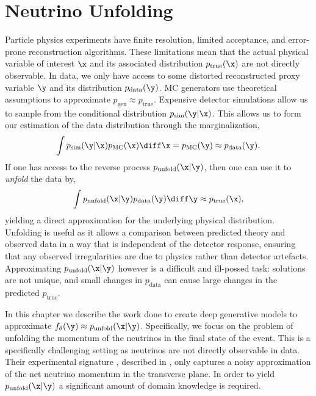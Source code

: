 \chapter{Neutrino Unfolding}
\label{ch:gnns}

Particle physics experiments have finite resolution, limited acceptance, and error-prone reconstruction algorithms.
These limitations mean that the actual physical variable of interest $\x$ and its associated distribution $p_\text{true}(\x)$ are not directly observable.
In data, we only have access to some distorted reconstructed proxy variable $\y$ and its distribution $p_\text{data}(\y)$.
MC generators use theoretical assumptions to approximate $p_\text{gen} \approx p_\text{true}$.
Expensive detector simulations allow us to sample from the conditional distribution $p_\text{sim}(\y|\x)$.
This allows us to form our estimation of the data distribution through the marginalization,
\begin{equation}
    \int p_\text{sim}(\y|\x) p_\text{MC}(\x) \diff\x = p_\text{MC}(\y) \approx p_\text{data}(\y).
\end{equation}
If one has access to the reverse process $p_\text{unfold}(\x|\y)$, then one can use it to \textit{unfold} the data by,
\begin{equation}
    \int p_\text{unfold}(\x|\y) p_\text{data}(\y) \diff\y \approx p_\text{true}(\x),
\end{equation}
yielding a direct approximation for the underlying physical distribution.
Unfolding is useful as it allows a comparison between predicted theory and observed data in a way that is independent of the detector response, ensuring that any observed irregularities are due to physics rather than detector artefacts.
Approximating $p_\text{unfold}(\x|\y)$ however is a difficult and ill-possed task: solutions are not unique, and small changes in $p_\text{data}$ can cause large changes in the predicted $p_\text{true}$.

In this chapter we describe the work done to create deep generative models to approximate $f_\theta(\y) \approx p_\text{unfold}(\x|\y)$.
Specifically, we focus on the problem of unfolding the momentum of the neutrinos in the final state of the event.
This is a specifically challenging setting as neutrinos are not directly observable in data.
Their experimental signature \ptmiss, described in , only captures a noisy approximation of the net neutrino momentum in the transverse plane.
In order to yield $p_\text{unfold}(\x|\y)$ a significant amount of domain knowledge is required.

